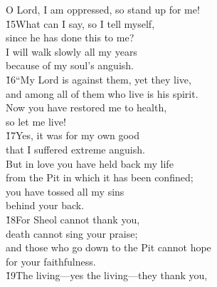 \begin{poetry}
\poemll    O Lord, I am oppressed, so stand up for me! \\
\poeml \v{15}What can I say, so I tell myself, \\
\poemll    since he has done this to me? \\
\poeml I will walk slowly all my years \\
\poemll    because of my soul's anguish. \\
\poeml \v{16}``My Lord is against them, yet they live, \\
\poemll    and among all of them who live is his spirit. \\
\poeml Now you have restored me to health, \\
\poemll    so let me live! \\
\poeml \v{17}Yes, it was for my own good \\
\poemll    that I suffered extreme anguish. \\
\poeml But in love you have held back my life \\
\poemll    from the Pit in which it has been confined; \\
\poeml you have tossed all my sins \\
\poemll    behind your back. \\
\poeml \v{18}For Sheol cannot thank you, \\
\poemll    death cannot sing your praise; \\
\poeml and those who go down to the Pit cannot hope \\
\poemll    for your faithfulness. \\
\poeml \v{19}The living---yes the living---they thank you, \\

\end{poetry}
